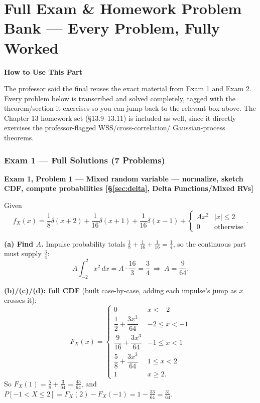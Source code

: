 \documentclass[11pt]{article}
\renewcommand{\P}[1]{P\left[#1\right]}
\newcommand{\topline}[1]{\par\vspace{5pt}\noindent{\color{#1}\rule{\linewidth}{1.1pt}}\par\vspace{3pt}}
\newcommand{\botline}[1]{\par\vspace{2pt}\noindent{\color{#1}\rule{\linewidth}{1.1pt}}\par\vspace{8pt}}
\newenvironment{notebox}[1]{%
  \topline{notecol}\noindent\textbf{\color{notecol}#1}\par\smallskip\noindent\ignorespaces
}{\botline{notecol}}
\newenvironment{examprob}[2]{%
  \topline{examcol}\noindent\textbf{\color{examcol}#1 --- #2}\par\smallskip\noindent\ignorespaces
}{\botline{examcol}}
\begin{document}
\clearpage
\part{Full Exam \& Homework Problem Bank --- Every Problem, Fully Worked}
\label{part:exams}

\begin{notebox}{How to Use This Part}
The professor said the final reuses the exact material from Exam 1 and Exam 2. Every problem
below is transcribed and solved completely, tagged with the theorem/section it exercises so
you can jump back to the relevant box above. The Chapter 13 homework set (\S13.9--13.11) is
included as well, since it directly exercises the professor-flagged WSS/cross-correlation/
Gaussian-process theorems.
\end{notebox}

\section{Exam 1 --- Full Solutions (7 Problems)}

\begin{examprob}{Exam 1, Problem 1}{Mixed random variable --- normalize, sketch CDF, compute probabilities \hfill [\S\ref{sec:delta}, Delta Functions/Mixed RVs]}
Given
\[ f_X(x) = \frac18\delta(x+2)+\frac{1}{16}\delta(x+1)+\frac1{16}\delta(x-1)+\begin{cases}Ax^2 & |x|\le2\\0&\text{otherwise}\end{cases}. \]

\textbf{(a) Find $A$.} Impulse probability totals $\frac18+\frac1{16}+\frac1{16}=\frac14$, so
the continuous part must supply $\frac34$:
\[ A\int_{-2}^{2}x^2\,dx = A\cdot\frac{16}{3} = \frac34 \ \Longrightarrow\ \boxed{A=\frac{9}{64}}. \]

\textbf{(b)/(c)/(d): full CDF} (built case-by-case, adding each impulse's jump as $x$ crosses it):
\[
F_X(x) = \begin{cases}
0 & x<-2\\[2pt]
\dfrac12+\dfrac{3x^3}{64} & -2\le x<-1\\[6pt]
\dfrac{9}{16}+\dfrac{3x^3}{64} & -1\le x<1\\[6pt]
\dfrac58+\dfrac{3x^3}{64} & 1\le x<2\\[2pt]
1 & x\ge2.
\end{cases}
\]
So $F_X(1)=\frac58+\frac{3}{64}=\boxed{\frac{43}{64}}$, and
$\P{-1<X\le2}=F_X(2)-F_X(-1)=1-\frac{33}{64}=\boxed{\frac{31}{64}}$.
\end{examprob}
\end{document}
